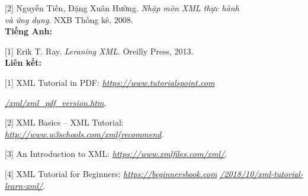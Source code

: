 [2] Nguyễn Tiến, Đặng Xuân Hường. \textit{Nhập môn XML thực hành \\ \indent \indent  và ứng dụng}. NXB Thống kê, 2008.\\

\textbf{Tiếng Anh:}

[1] Erik T. Ray. \textit{Leraning XML}.	Oreilly Press, 2013.\\

\textbf{Liên kết:}

[1] XML Tutorial in PDF: \textit{\url{https://www.tutorialspoint.com}}

\indent \indent \textit{\url{/xml/xml_pdf_version.htm}}.

[2] XML Basics – XML Tutorial: \\ \indent \textit{\url{http://www.w3schools.com/xml(recommend}}.

[3] An Introduction to XML: \textit{\url{ https://www.xmlfiles.com/xml/}}.

[4] XML Tutorial for Beginners: 	\textit{\url{https://beginnersbook.com}}
\indent \indent \textit{\url{/2018/10/xml-tutorial-learn-xml/}}.

